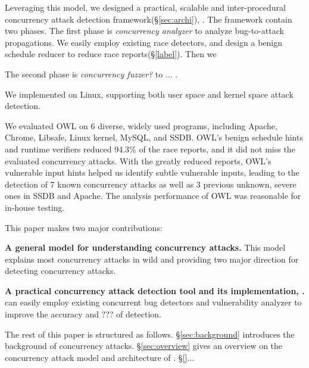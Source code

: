 Leveraging this model, we designed a practical, scalable and inter-procedural concurrency 
attack detection framework(\S\ref{sec:archi}), \xxx. 
The framework contain two phases.
The first phase is \emph{concurrency analyzer} to analyze bug-to-attack propagations. 
We easily employ existing race detectors, and design a benign schedule reducer to reduce race reports(\S\ref{label}). 
Then we 

The second phase is \emph{concurrency fuzzer?} to ... .

We implemented \xxx on Linux, supporting both user space and kernel space attack detection. 



We evaluated OWL on 6 diverse, widely used programs, including Apache, Chrome, Libsafe, Linux kernel, MySQL,
and SSDB. OWL’s benign schedule hints and runtime verifiers reduced 94.3\% of the race reports, 
and it did not miss the evaluated concurrency attacks. With the greatly reduced reports,
OWL’s vulnerable input hints helped us identify subtle
vulnerable inputs, leading to the detection of 7 known concurrency
attacks as well as 3 previous unknown, severe ones
in SSDB and Apache. The analysis performance of OWL was
reasonable for in-house testing.


This paper makes two major contributions:

\begin{tightenum}
\item \textbf{A general model for understanding concurrency attacks.} 
This model explains most concurrency attacks in wild and 
providing two major direction for detecting concurrency attacks. 
	
\item \textbf{A practical concurrency attack detection tool and its implementation, \xxx.} 
\xxx can easily employ existing concurrent bug detectors and vulnerability analyzer 
to improve the accuracy and ??? of detection.
	
\end{tightenum}

 

The rest of this paper is structured as follows. 
\S\ref{sec:background} introduces the background of concurrency attacks.
\S\ref{sec:overview} gives an overview on the concurrency attack model and architecture of \xxx.
\S\ref{}...





